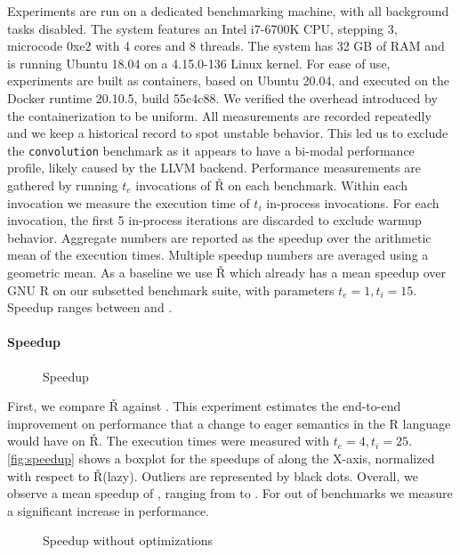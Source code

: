 \documentclass[review,creen,acmsmall]{acmart}
\renewcommand{\Rsh}{{\sf\v R}\xspace}
\begin{document}
Experiments are run on a dedicated benchmarking machine, with all background
tasks disabled. The system features an Intel i7-6700K CPU, stepping 3, microcode
0xe2 with 4 cores and 8 threads. The system has 32 GB of RAM and is running
Ubuntu 18.04 on a 4.15.0-136 Linux kernel. For ease of use, experiments are
built as containers, based on Ubuntu 20.04, and executed on the Docker runtime
20.10.5, build 55c4c88. We verified the overhead introduced by the
containerization to be uniform. All measurements are recorded repeatedly and we
keep a historical record to spot unstable behavior. This led us to exclude the
\lstinline{convolution} benchmark as it appears to have a bi-modal performance
profile, likely caused by the LLVM backend. Performance measurements are
gathered by running $t_e$ invocations of \Rsh on each benchmark. Within each
invocation we measure the execution time of $t_i$ in-process invocations. For
each invocation, the first 5 in-process iterations are discarded to exclude
warmup behavior. Aggregate numbers are reported as the speedup over the
arithmetic mean of the execution times. Multiple speedup numbers are averaged
using a geometric mean. As a baseline we use \Rsh which already has a
\speedupRsh mean speedup over GNU R on our subsetted benchmark suite, with
parameters $t_e = 1, t_i = 15$. Speedup ranges between \speedupRshMin and
\speedupRshMax.

\paragraph{Speedup}

\begin{figure}[h]
  \centering 
  \caption{Speedup} \label{fig:speedup}
\end{figure}

First, we compare \Rsh against \rshstrict. This experiment estimates the
end-to-end improvement on performance that a change to eager semantics in the R
language would have on \Rsh. The execution times were measured with $t_e = 4,
t_i = 25$. \autoref{fig:speedup} shows a boxplot for the speedups of \rshstrict
along the X-axis, normalized with respect to \Rsh (lazy). Outliers are
represented by black dots. Overall, we observe a mean speedup of
\speedupRshStrict, ranging from \speedupRshStrictMin to \speedupRshStrictMax.
For \speedupRshStrictSignificant out of \benchmarkSuiteSize benchmarks we
measure a significant increase in performance.
%
\begin{figure}[h]
  \centering
  
  \caption{Speedup without optimizations}
  \label{fig:speedup-bc}
\end{figure}
%
\end{document}
